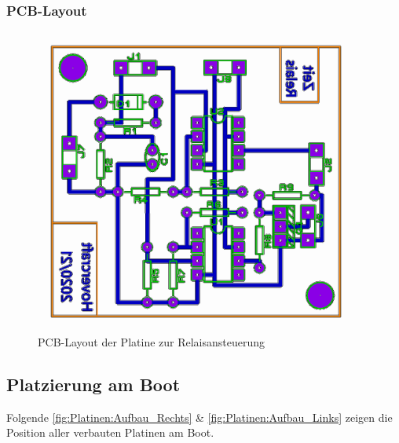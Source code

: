 \subsubsection{PCB-Layout}
\begin{figure}[h]
    \centering
    \includegraphics[width=0.95\textwidth]{../Proteus/Exports/Relaisansteuerung_PCB.png}
    \caption{PCB-Layout der Platine zur Relaisansteuerung}
\end{figure}
\newpage

\subsection{Platzierung am Boot}
Folgende \autoref{fig:Platinen:Aufbau_Rechts} \& \autoref{fig:Platinen:Aufbau_Links} zeigen die Position aller verbauten Platinen am Boot.

